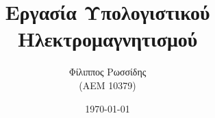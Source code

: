 \documentclass[10pt, letterpaper]{article}
\title{Εργασία Υπολογιστικού Ηλεκτρομαγνητισμού}
\author{Φίλιππος Ρωσσίδης \\ (ΑΕΜ 10379)}
\date{\today}
\newcommand{\en}{\selectlanguage{english}}
\newcommand{\gr}{\selectlanguage{greek}}
\begin{document}
\maketitle

\end{document}
